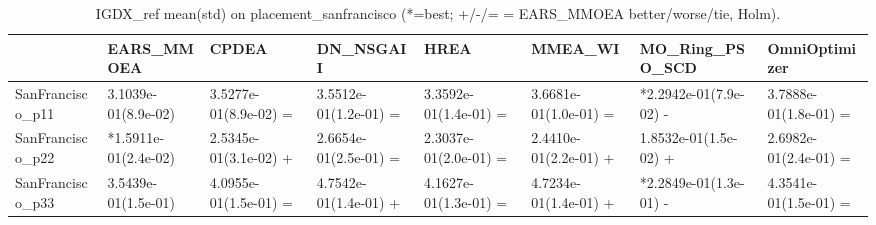 \begin{table}[t]
\centering
\caption{IGDX_ref mean(std) on placement_sanfrancisco (*=best; +/-/= = EARS_MMOEA better/worse/tie, Holm).}
\label{tab:placement_sanfrancisco_IGDX_ref}
\begin{tabular}{llllllll}
\toprule
 & EARS\_MMOEA & CPDEA & DN\_NSGAII & HREA & MMEA\_WI & MO\_Ring\_PSO\_SCD & OmniOptimizer \\
\midrule
SanFrancisco\_p11 & 3.1039e-01(8.9e-02) & 3.5277e-01(8.9e-02) = & 3.5512e-01(1.2e-01) = & 3.3592e-01(1.4e-01) = & 3.6681e-01(1.0e-01) = & *2.2942e-01(7.9e-02) - & 3.7888e-01(1.8e-01) = \\
SanFrancisco\_p22 & *1.5911e-01(2.4e-02) & 2.5345e-01(3.1e-02) + & 2.6654e-01(2.5e-01) = & 2.3037e-01(2.0e-01) = & 2.4410e-01(2.2e-01) + & 1.8532e-01(1.5e-02) + & 2.6982e-01(2.4e-01) = \\
SanFrancisco\_p33 & 3.5439e-01(1.5e-01) & 4.0955e-01(1.5e-01) = & 4.7542e-01(1.4e-01) + & 4.1627e-01(1.3e-01) = & 4.7234e-01(1.4e-01) + & *2.2849e-01(1.3e-01) - & 4.3541e-01(1.5e-01) = \\
\bottomrule
\end{tabular}
\end{table}
